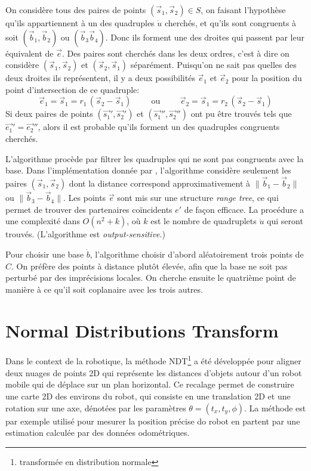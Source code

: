 \documentclass[a4paper,10pt]{scrreprt}
\begin{document}
On considère tous des paires de points $(\vec{s}_1, \vec{s}_2) \in S$, on faisant l'hypothèse qu'ils appartiennent à un des quadruples $\dot{u}$ cherchés, et qu'ils sont congruents à soit $(\vec{b}_1, \vec{b}_2)$ ou $(\vec{b}_3 \vec{b}_4)$. Donc ils forment une des droites qui passent par leur équivalent de $\vec{e}$. Des paires sont cherchés dans les deux ordres, c'est à dire on considère $(\vec{s}_1, \vec{s}_2)$ et $(\vec{s}_2, \vec{s}_1)$ séparément. Puisqu'on ne sait pas quelles des deux droites ils représentent, il y a deux possibilités $\vec{e}_1$ et $\vec{e}_2$ pour la position du point d'intersection de ce quadruple:
\begin{equation}
	\vec{e}_1 = \vec{s}_1 = r_1 \, (\vec{s}_2 - \vec{s}_1)
	\hspace{1cm} \text{ou} \hspace{1cm}
	\vec{e}_2 = \vec{s}_1 = r_2 \, (\vec{s}_2 - \vec{s}_1)	
\end{equation}
Si deux paires de points $(\vec{s_1}', \vec{s_2}')$ et $(\vec{s_1}'', \vec{s_2}'')$ ont pu être trouvés tels que $\vec{e_1}' = \vec{e_2}''$, alors il est probable qu'ils forment un des quadruples congruents cherchés.

L'algorithme procède par filtrer les quadruples qui ne sont pas congruents avec la base. Dans l'implémentation donnée par \cite{Aige2008}, l'algorithme considère seulement les paires $(\vec{s}_1, \vec{s}_2)$ dont la distance correspond approximativement à $\| \vec{b}_1 - \vec{b}_2 \|$ ou $\| \vec{b}_3 - \vec{b}_4 \|$. Les points $\vec{e}$ sont mis sur une structure \emph{range tree}, ce qui permet de trouver des partenaires coïncidents $e'$ de façon efficace. La procédure a une complexité dans $O(n^2 + k)$, où $k$ est le nombre de quadruplets $\dot{u}$ qui seront trouvés. (L'algorithme est \emph{output-sensitive}.)

Pour choisir une base $\dot{b}$, l'algorithme choisir d'abord aléatoirement trois points de $C$. On préfère des points à distance plutôt élevée, afin que la base ne soit pas perturbé par des imprécisions locales. On cherche ensuite le quatrième point de manière à ce qu'il soit coplanaire avec les trois autres.



\section{Normal Distributions Transform}
Dans le context de la robotique, la méthode NDT\footnote{transformée en distribution normale} a été développée pour aligner deux nuages de points 2D qui représente les distances d'objets autour d'un robot mobile qui de déplace sur un plan horizontal. \cite{Bibe2003} Ce recalage permet de construire une carte 2D des environs du robot, qui consiste en une translation 2D et une rotation sur une axe, dénotées par les paramètres $\theta = (t_x, t_y, \phi)$. La méthode est par exemple utilisé pour mesurer la position précise do robot en partent par une estimation calculée par des données odométriques.
\end{document}
